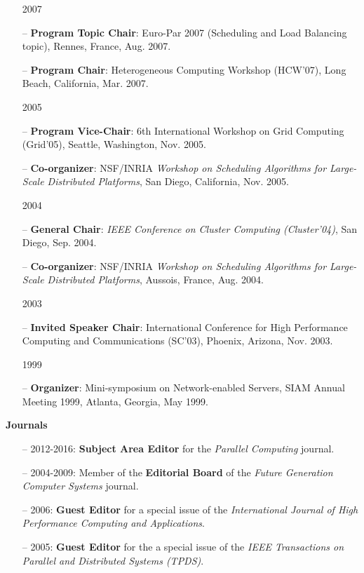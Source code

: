 \documentclass[times,11pt]{letter}
\begin{document}
\begin{itemize}
\item [2007]
\item[--] {\bf Program Topic Chair}: Euro-Par 2007 (Scheduling and Load Balancing topic), Rennes, France, Aug. 2007.
\item[--] {\bf Program Chair}: Heterogeneous Computing Workshop (HCW'07), Long Beach, California, Mar. 2007.
\item [2005]
\item[--] {\bf Program Vice-Chair}: 6th International Workshop on Grid Computing (Grid'05), Seattle, Washington, Nov. 2005.
\item[--] {\bf Co-organizer}: NSF/INRIA \emph{Workshop on Scheduling Algorithms for Large-Scale Distributed Platforms}, San Diego, California, Nov. 2005.
\item [2004]
\item[--] {\bf General Chair}: \emph{IEEE Conference on Cluster Computing (Cluster'04)}, San Diego, Sep. 2004.
\item[--] {\bf Co-organizer}: NSF/INRIA \emph{Workshop on Scheduling Algorithms for Large-Scale Distributed Platforms}, Aussois, France, Aug. 2004.
\item [2003]
\item[--] {\bf Invited Speaker Chair}: International Conference for High Performance Computing and Communications (SC'03), Phoenix, Arizona, Nov. 2003.
\item [1999]
\item[--] {\bf Organizer}: Mini-symposium on Network-enabled Servers, SIAM Annual Meeting 1999, Atlanta, Georgia, May 1999.
\end{itemize}

\noindent
{\bf Journals}
\begin{itemize}
\item[--] 2012-2016: {\bf Subject Area Editor} for the \emph{Parallel Computing} journal.
\item[--] 2004-2009: Member of the {\bf Editorial Board} of the \emph{Future Generation Computer Systems} journal.
\item[--] 2006: {\bf Guest Editor} for a special issue of the \emph{International Journal of High Performance Computing and Applications}.
\item[--] 2005: {\bf Guest Editor} for the a special issue of the \emph{IEEE Transactions on Parallel and Distributed Systems (TPDS)}. 
\end{itemize}
\end{document}
